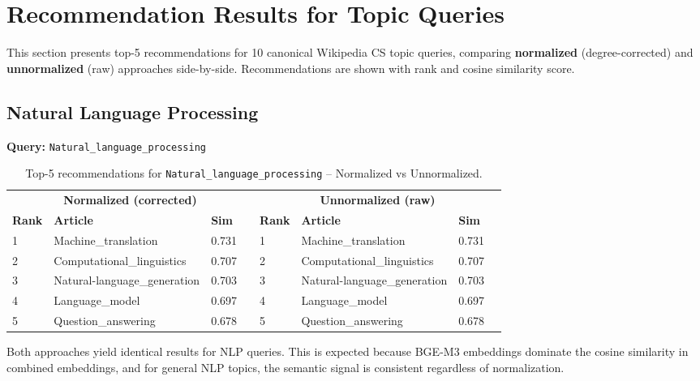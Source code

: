 \documentclass[12pt,a4paper]{article}
\begin{document}
\section{Recommendation Results for Topic Queries}

This section presents top-5 recommendations for 10 canonical Wikipedia CS topic
queries, comparing \textbf{normalized} (degree-corrected) and \textbf{unnormalized}
(raw) approaches side-by-side.  Recommendations are shown with rank and cosine
similarity score.

\subsection{Natural Language Processing}

\textbf{Query:} \texttt{Natural\_language\_processing}

\begin{table}[H]
\centering
\caption{Top-5 recommendations for \texttt{Natural\_language\_processing} -- Normalized vs Unnormalized.}
\label{tab:nlp}
\begin{tabular}{lllr|lllr}
\toprule
\multicolumn{4}{c}{\textbf{Normalized (corrected)}} & \multicolumn{4}{c}{\textbf{Unnormalized (raw)}} \\
\cmidrule(lr){1-4}\cmidrule(lr){5-8}
\textbf{Rank} & \textbf{Article} & \textbf{Sim} & & \textbf{Rank} & \textbf{Article} & \textbf{Sim} \\
\midrule
1 & Machine\_translation & 0.731 & & 1 & Machine\_translation & 0.731 \\
2 & Computational\_linguistics & 0.707 & & 2 & Computational\_linguistics & 0.707 \\
3 & Natural-language\_generation & 0.703 & & 3 & Natural-language\_generation & 0.703 \\
4 & Language\_model & 0.697 & & 4 & Language\_model & 0.697 \\
5 & Question\_answering & 0.678 & & 5 & Question\_answering & 0.678 \\
\bottomrule
\end{tabular}
\end{table}

Both approaches yield identical results for NLP queries.  This is expected because
BGE-M3 embeddings dominate the cosine similarity in combined embeddings, and for
general NLP topics, the semantic signal is consistent regardless of normalization.
\end{document}
